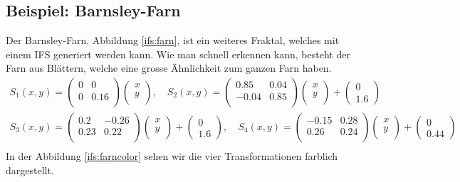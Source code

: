 \subsection{Beispiel: Barnsley-Farn}
Der Barnsley-Farn, Abbildung \ref{ifs:farn}, ist ein weiteres Fraktal, welches mit einem IFS generiert werden kann.
Wie man schnell erkennen kann, besteht der Farn aus Blättern, welche eine grosse Ähnlichkeit zum ganzen Farn haben.
\begin{align*}
	{S_1(x,y)}
	= 
	\begin{pmatrix}
		0 & 0 \\
		0 & 0.16 \\
	\end{pmatrix}
	\begin{pmatrix}
		x\\
		y\\
	\end{pmatrix}, \quad
	{S_2(x,y)}
	= 
	\begin{pmatrix}
		0.85 & 0.04 \\
		-0.04 & 0.85 \\
	\end{pmatrix}
	\begin{pmatrix}
		x\\
		y\\
	\end{pmatrix} 
	+
	\begin{pmatrix}
		0 \\
		1.6
	\end{pmatrix}\\
	{S_3(x,y)}
	= 
	\begin{pmatrix}
		0.2 & -0.26 \\
		0.23 & 0.22 \\
	\end{pmatrix}
	\begin{pmatrix}
		x\\
		y\\
	\end{pmatrix} 
	+
	\begin{pmatrix}
		0 \\
		1.6
	\end{pmatrix}, \quad
	{S_4(x,y)}
	= 
	\begin{pmatrix}
		-0.15 & 0.28 \\
		0.26 & 0.24 \\
	\end{pmatrix}
	\begin{pmatrix}
		x\\
		y\\
	\end{pmatrix} 
	+
	\begin{pmatrix}
		0 \\
		0.44
	\end{pmatrix}\\
\end{align*}
In der Abbildung \ref{ifs:farncolor} sehen wir die vier Transformationen farblich dargestellt.


